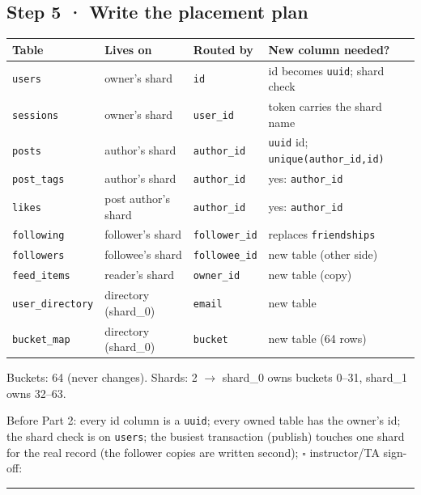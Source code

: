 \subsection*{Step 5 · Write the placement plan}
\begin{center}\small
\begin{tabular}{@{}llll@{}}
\toprule
Table & Lives on & Routed by & New column needed? \\
\midrule
\texttt{users} & owner's shard & \texttt{id} & id becomes \texttt{uuid}; shard check \\
\texttt{sessions} & owner's shard & \texttt{user\_id} & token carries the shard name \\
\texttt{posts} & author's shard & \texttt{author\_id} & \texttt{uuid} id; \texttt{unique(author\_id,id)} \\
\texttt{post\_tags} & author's shard & \texttt{author\_id} & yes: \texttt{author\_id} \\
\texttt{likes} & post author's shard & \texttt{author\_id} & yes: \texttt{author\_id} \\
\texttt{following} & follower's shard & \texttt{follower\_id} & replaces \texttt{friendships} \\
\texttt{followers} & followee's shard & \texttt{followee\_id} & new table (other side) \\
\texttt{feed\_items} & reader's shard & \texttt{owner\_id} & new table (copy) \\
\texttt{user\_directory} & directory (shard\_0) & \texttt{email} & new table \\
\texttt{bucket\_map} & directory (shard\_0) & \texttt{bucket} & new table (64 rows) \\
\bottomrule
\end{tabular}
\end{center}
Buckets: 64 (never changes). Shards: 2 $\rightarrow$ shard\_0 owns buckets 0--31, shard\_1 owns 32--63.

\noindent Before Part 2:\quad {} every id column is a \texttt{uuid};
 every owned table has the owner's id;
 the shard check is on \texttt{users};
 the busiest transaction (publish) touches one shard for the real record (the follower copies are
written second); \quad $\square$ instructor/TA sign-off: \rule{3cm}{0.4pt}
